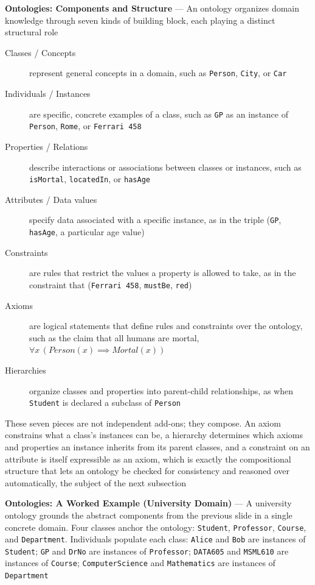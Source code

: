 \textbf{Ontologies: Components and Structure} --- An ontology organizes
domain knowledge through seven kinds of building block, each playing a
distinct structural role
\begin{description}
  \item[Classes / Concepts] represent general concepts in a domain, such as
    \texttt{Person}, \texttt{City}, or \texttt{Car}

  \item[Individuals / Instances] are specific, concrete examples of a
    class, such as \texttt{GP} as an instance of \texttt{Person},
    \texttt{Rome}, or \texttt{Ferrari 458}

  \item[Properties / Relations] describe interactions or associations
    between classes or instances, such as \texttt{isMortal},
    \texttt{locatedIn}, or \texttt{hasAge}

  \item[Attributes / Data values] specify data associated with a specific
    instance, as in the triple (\texttt{GP}, \texttt{hasAge}, a particular
    age value)

  \item[Constraints] are rules that restrict the values a property is
    allowed to take, as in the constraint that (\texttt{Ferrari 458},
    \texttt{mustBe}, \texttt{red})

  \item[Axioms] are logical statements that define rules and constraints
    over the ontology, such as the claim that all humans are mortal,
    $\forall x\, (Person(x) \implies Mortal(x))$

  \item[Hierarchies] organize classes and properties into parent-child
    relationships, as when \texttt{Student} is declared a subclass of
    \texttt{Person}
\end{description}
These seven pieces are not independent add-ons; they compose. An axiom
constrains what a class's instances can be, a hierarchy determines which
axioms and properties an instance inherits from its parent classes, and a
constraint on an attribute is itself expressible as an axiom, which is
exactly the compositional structure that lets an ontology be checked for
consistency and reasoned over automatically, the subject of the next
subsection

\textbf{Ontologies: A Worked Example (University Domain)} --- A university
ontology grounds the abstract components from the previous slide in a
single concrete domain. Four classes anchor the ontology: \texttt{Student},
\texttt{Professor}, \texttt{Course}, and \texttt{Department}. Individuals
populate each class: \texttt{Alice} and \texttt{Bob} are instances of
\texttt{Student}; \texttt{GP} and \texttt{DrNo} are instances of
\texttt{Professor}; \texttt{DATA605} and \texttt{MSML610} are instances of
\texttt{Course}; \texttt{ComputerScience} and \texttt{Mathematics} are
instances of \texttt{Department}

